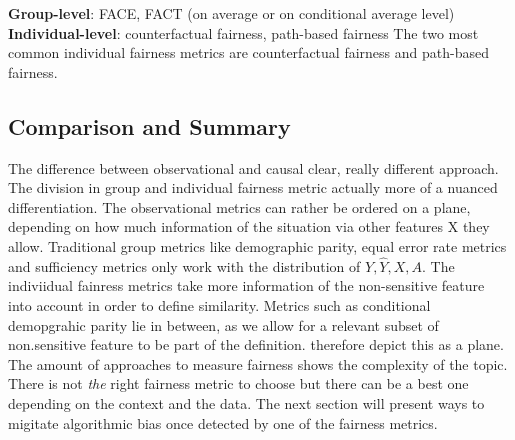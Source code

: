 \textbf{Group-level}: FACE, FACT (on average or on conditional average level) \parencite{Zafar2017PPNFC}\\
\textbf{Individual-level}: counterfactual fairness, path-based fairness \parencite{kusner} 
The two most common individual fairness metrics are counterfactual fairness and path-based fairness.


\subsection*{Comparison and Summary}
The difference between observational and causal clear, really different approach. The division in group and individual fairness metric actually more of a nuanced differentiation. The observational metrics can rather be ordered on a plane, depending on how much information of the situation via other features X they allow.
Traditional group metrics like demographic parity, equal error rate metrics and sufficiency metrics only work with the distribution of $Y, \hat{Y}, X, A$. The indiviidual fainress metrics take more information of the non-sensitive feature into account in order to define similarity. Metrics such as conditional demopgrahic parity lie in between, as we allow for a relevant subset of non.sensitive feature to be part of the definition.
\cite{castelnovo2022} therefore depict this as a plane.
The amount of approaches to measure fairness shows the complexity of the topic. There is not \textit{the} right fairness metric to choose but there can be a best one depending on the context and the data. The next section will present ways to migitate algorithmic bias once detected by one of the fairness metrics.


